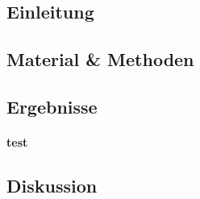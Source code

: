 \subsection*{Einleitung}

\lipsum[1-3]

\subsection*{Material \& Methoden}

\lipsum


\subsection*{Ergebnisse}

\paragraph{test}

\lipsum[3]

\subsection*{Diskussion}

\lipsum[4]